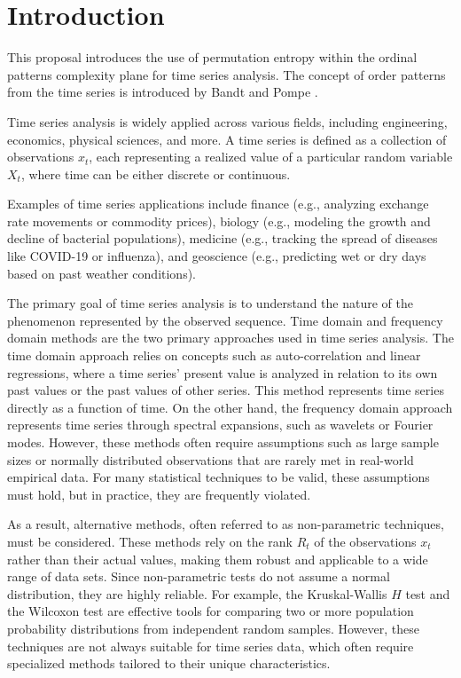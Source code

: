 \chapter{Introduction}\label{C:intro}

This proposal introduces the use of permutation entropy within the ordinal patterns complexity plane for time series analysis. The concept of order patterns from the time series is introduced by Bandt and Pompe \cite{PhysRevLett.88.174102}. 

Time series analysis is widely applied across various fields, including engineering, economics, physical sciences, and more. A time series is defined as a collection of observations ${x_t}$, each representing a realized value of a particular random variable $X_t$, where time can be either discrete or continuous.

Examples of time series applications include finance (e.g., analyzing exchange rate movements or commodity prices), biology (e.g., modeling the growth and decline of bacterial populations), medicine (e.g., tracking the spread of diseases like COVID-19 or influenza), and geoscience (e.g., predicting wet or dry days based on past weather conditions).

The primary goal of time series analysis is to understand the nature of the phenomenon represented by the observed sequence. Time domain and frequency domain methods are the two primary approaches used in time series analysis. The time domain approach relies on concepts such as auto-correlation and linear regressions, where a time series' present value is analyzed in relation to its own past values or the past values of other series. This method represents time series directly as a function of time. On the other hand, the frequency domain approach represents time series through spectral expansions, such as wavelets or Fourier modes. However, these methods often require assumptions such as large sample sizes or normally distributed observations that are rarely met in real-world empirical data. For many statistical techniques to be valid, these assumptions must hold, but in practice, they are frequently violated.

As a result, alternative methods, often referred to as non-parametric techniques, must be considered. These methods rely on the rank $R_t$ of the observations $x_t$ rather than their actual values, making them robust and applicable to a wide range of data sets. Since non-parametric tests do not assume a normal distribution, they are highly reliable. For example, the Kruskal-Wallis $H$ test and the Wilcoxon test are effective tools for comparing two or more population probability distributions from independent random samples. However, these techniques are not always suitable for time series data, which often require specialized methods tailored to their unique characteristics.

